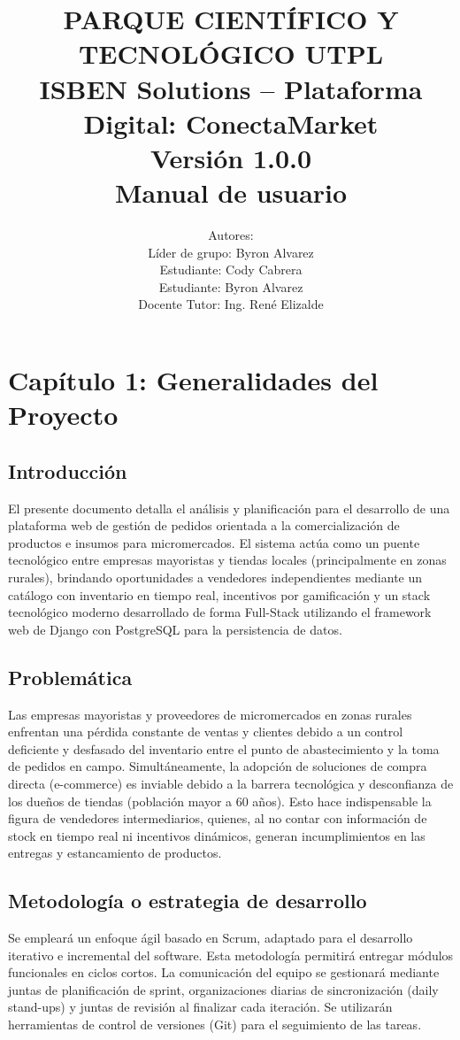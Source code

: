 \documentclass{article}
\title{PARQUE CIENTÍFICO Y TECNOLÓGICO UTPL \\
ISBEN Solutions – Plataforma Digital: ConectaMarket\\
Versión 1.0.0 \\
Manual de usuario }
\author{
Autores: \\
Líder de grupo: Byron Alvarez \\
Estudiante: Cody Cabrera \\
Estudiante: Byron Alvarez \\
Docente Tutor: Ing. René Elizalde
}
\date{}
\begin{document}
\maketitle

\section{Capítulo 1: Generalidades del Proyecto} 

\subsection{Introducción} 
El presente documento detalla el análisis y planificación para el desarrollo de una plataforma web de gestión de pedidos orientada a la comercialización de productos e insumos para micromercados. 
El sistema actúa como un puente tecnológico entre empresas mayoristas y tiendas locales (principalmente en zonas rurales), brindando oportunidades a vendedores independientes mediante un catálogo con inventario en tiempo real, incentivos por gamificación y un stack tecnológico moderno desarrollado de forma Full-Stack utilizando el framework web de Django con PostgreSQL para la persistencia de datos. 

\subsection{Problemática} 
Las empresas mayoristas y proveedores de micromercados en zonas rurales enfrentan una pérdida constante de ventas y clientes debido a un control deficiente y desfasado del inventario entre el punto de abastecimiento y la toma de pedidos en campo. 
Simultáneamente, la adopción de soluciones de compra directa (e-commerce) es inviable debido a la barrera tecnológica y desconfianza de los dueños de tiendas (población mayor a 60 años). 
Esto hace indispensable la figura de vendedores intermediarios, quienes, al no contar con información de stock en tiempo real ni incentivos dinámicos, generan incumplimientos en las entregas y estancamiento de productos. 

\subsection{Metodología o estrategia de desarrollo} 
Se empleará un enfoque ágil basado en Scrum, adaptado para el desarrollo iterativo e incremental del software. 
Esta metodología permitirá entregar módulos funcionales en ciclos cortos. La comunicación del equipo se gestionará mediante juntas de planificación de sprint, organizaciones diarias de sincronización (daily stand-ups) y juntas de revisión al finalizar cada iteración. 
Se utilizarán herramientas de control de versiones (Git) para el seguimiento de las tareas. 
\end{document}
